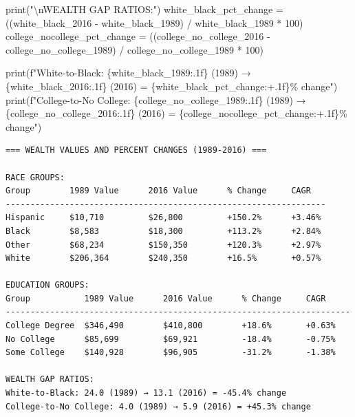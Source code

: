 \documentclass[
  letterpaper,
  DIV=11,
  numbers=noendperiod]{scrartcl}
\newenvironment{Shaded}{\begin{snugshade}}{\end{snugshade}}
\newcommand{\BuiltInTok}[1]{\textcolor[rgb]{0.00,0.23,0.31}{#1}}
\newcommand{\CharTok}[1]{\textcolor[rgb]{0.13,0.47,0.30}{#1}}
\newcommand{\DecValTok}[1]{\textcolor[rgb]{0.68,0.00,0.00}{#1}}
\newcommand{\NormalTok}[1]{\textcolor[rgb]{0.00,0.23,0.31}{#1}}
\newcommand{\OperatorTok}[1]{\textcolor[rgb]{0.37,0.37,0.37}{#1}}
\newcommand{\SpecialCharTok}[1]{\textcolor[rgb]{0.37,0.37,0.37}{#1}}
\newcommand{\SpecialStringTok}[1]{\textcolor[rgb]{0.13,0.47,0.30}{#1}}
\newcommand{\StringTok}[1]{\textcolor[rgb]{0.13,0.47,0.30}{#1}}
\begin{document}
\begin{Shaded}
\begin{Highlighting}[]
\BuiltInTok{print}\NormalTok{(}\StringTok{"}\CharTok{\textbackslash{}n}\StringTok{WEALTH GAP RATIOS:"}\NormalTok{)}
\NormalTok{white\_black\_pct\_change }\OperatorTok{=}\NormalTok{ ((white\_black\_2016 }\OperatorTok{{-}}\NormalTok{ white\_black\_1989) }\OperatorTok{/}\NormalTok{ white\_black\_1989 }\OperatorTok{*} \DecValTok{100}\NormalTok{)}
\NormalTok{college\_nocollege\_pct\_change }\OperatorTok{=}\NormalTok{ ((college\_no\_college\_2016 }\OperatorTok{{-}}\NormalTok{ college\_no\_college\_1989) }\OperatorTok{/}\NormalTok{ college\_no\_college\_1989 }\OperatorTok{*} \DecValTok{100}\NormalTok{)}

\BuiltInTok{print}\NormalTok{(}\SpecialStringTok{f"White{-}to{-}Black: }\SpecialCharTok{\{}\NormalTok{white\_black\_1989}\SpecialCharTok{:.1f\}}\SpecialStringTok{ (1989) → }\SpecialCharTok{\{}\NormalTok{white\_black\_2016}\SpecialCharTok{:.1f\}}\SpecialStringTok{ (2016) = }\SpecialCharTok{\{}\NormalTok{white\_black\_pct\_change}\SpecialCharTok{:+.1f\}}\SpecialStringTok{\% change"}\NormalTok{)}
\BuiltInTok{print}\NormalTok{(}\SpecialStringTok{f"College{-}to{-}No College: }\SpecialCharTok{\{}\NormalTok{college\_no\_college\_1989}\SpecialCharTok{:.1f\}}\SpecialStringTok{ (1989) → }\SpecialCharTok{\{}\NormalTok{college\_no\_college\_2016}\SpecialCharTok{:.1f\}}\SpecialStringTok{ (2016) = }\SpecialCharTok{\{}\NormalTok{college\_nocollege\_pct\_change}\SpecialCharTok{:+.1f\}}\SpecialStringTok{\% change"}\NormalTok{)}
\end{Highlighting}
\end{Shaded}

\begin{verbatim}
=== WEALTH VALUES AND PERCENT CHANGES (1989-2016) ===

RACE GROUPS:
Group        1989 Value      2016 Value      % Change     CAGR    
-----------------------------------------------------------------
Hispanic     $10,710         $26,800         +150.2%      +3.46%  
Black        $8,583          $18,300         +113.2%      +2.84%  
Other        $68,234         $150,350        +120.3%      +2.97%  
White        $206,364        $240,350        +16.5%       +0.57%  

EDUCATION GROUPS:
Group           1989 Value      2016 Value      % Change     CAGR    
----------------------------------------------------------------------
College Degree  $346,490        $410,800        +18.6%       +0.63%  
No College      $85,699         $69,921         -18.4%       -0.75%  
Some College    $140,928        $96,905         -31.2%       -1.38%  

WEALTH GAP RATIOS:
White-to-Black: 24.0 (1989) → 13.1 (2016) = -45.4% change
College-to-No College: 4.0 (1989) → 5.9 (2016) = +45.3% change
\end{verbatim}
\end{document}
